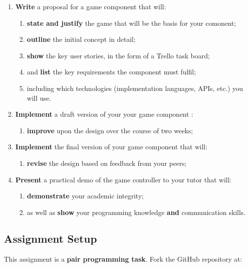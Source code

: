 \documentclass{../fal_assignment}
\begin{document}
\begin{enumerate}[label=(\Alph*)]
    \item \textbf{Write} a proposal for a game component that will:
        	\begin{enumerate}[label=\roman*.]
    		\item \textbf{state and justify} the game that will be the basis for your comonent;
    		\item \textbf{outline} the initial concept in detail;
		\item \textbf{show} the key user stories, in the form of a Trello task board;
		\item and \textbf{list} the key requirements the component must fulfil;
		\item including which technologies (implementation languages, APIs, etc.) you will use.  
	\end{enumerate}
    \item \textbf{Implement} a draft version of your your game component :
    	\begin{enumerate}[label=\roman*.]
		\item \textbf{improve} upon the design over the course of two weeks;
	\end{enumerate}
    \item \textbf{Implement} the final version of your game component that will:
    	\begin{enumerate}[label=\roman*.]
    		\item \textbf{revise} the design based on feedback from your peers;
	\end{enumerate}
     \item \textbf{Present} a practical demo of the game controller to your tutor that will:
    	\begin{enumerate}[label=\roman*.]
    		\item \textbf{demonstrate} your academic integrity;
    		\item as well as \textbf{show} your programming knowledge \textbf{and} communication skills.
	\end{enumerate}
\end{enumerate}    

\subsection*{Assignment Setup}

This assignment is a \textbf{pair programming task}. Fork the GitHub repository at:
\end{document}
